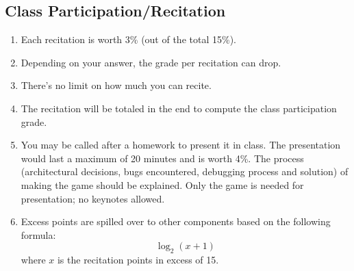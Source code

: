 \documentclass[10pt]{article}
\begin{document}
\subsection{Class Participation/Recitation}
\begin{enumerate}[noitemsep]
\item Each recitation is worth 3\% (out of the total 15\%).
\item Depending on your answer, the grade per recitation can drop.
\item There's no limit on how much you can recite.
\item The recitation will be totaled in the end to compute the class participation grade.
\item You may be called after a homework to present it in class. The presentation would last a maximum of 20 minutes and is worth 4\%. The process (architectural decisions, bugs encountered, debugging process and solution) of making the game should be explained. Only the game is needed for presentation; no keynotes allowed.
\item Excess points are spilled over to other components based on the following formula:
$$
\log_2(x + 1)
$$
where $x$ is the recitation points in excess of 15.
\end{enumerate}
\end{document}
